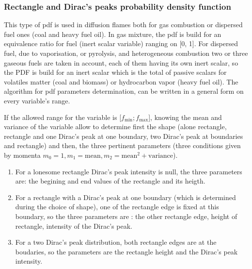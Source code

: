\subsubsection{Rectangle and Dirac's peaks probability density function}

This type of pdf is used in diffusion flames both for gas combustion or
dispersed fuel ones (coal and heavy fuel oil). In gas mixture, the pdf is build
for an equivalence ratio for fuel (inert scalar variable) ranging on [0, 1]. For
dispersed fuel, due to vaporisation, or pyrolysis, and heterogeneous combustion
two or three gaseous fuels are taken in account, each of them having its own
inert scalar, so the PDF is build for an inert scalar which is the total of
passive scalars for volatiles matter (coal and biomass) or hydrocarbon vapor
(heavy
fuel oil). The algorithm for pdf parameters determination, can be written in a general form on every variable's range.

If the allowed range for the variable is [$f_{\min} ; f_{\max}$], knowing the
mean and variance of the variable allow to determine first the shape (alone
rectangle, rectangle and one Dirac's peak at one boundary, two Dirac's peak at
boundaries and rectangle) and then, the three pertinent parameters (three
conditions given by momenta $m_{0}=1, m_{1}=\text{mean},
m_{2}=\text{mean}^{2}+\text{variance}$).

\begin{enumerate}
\item For a lonesome rectangle Dirac's peak intensity is null, the three
  parameters are: the begining and end values of the rectangle and its heigth.
\item For a rectangle with a Dirac's peak at one boundary (which is determined
  during the choice of shape), one of the rectangle edge is fixed at this
  boundary, so the three parameters are : the other rectangle edge, height of
  rectangle, intensity of the Dirac's peak.
\item For a two Dirac's peak distribution, both rectangle edges are at the
  boudaries, so the parameters are the rectangle height and the Dirac's peak
  intensity.
\end{enumerate}

